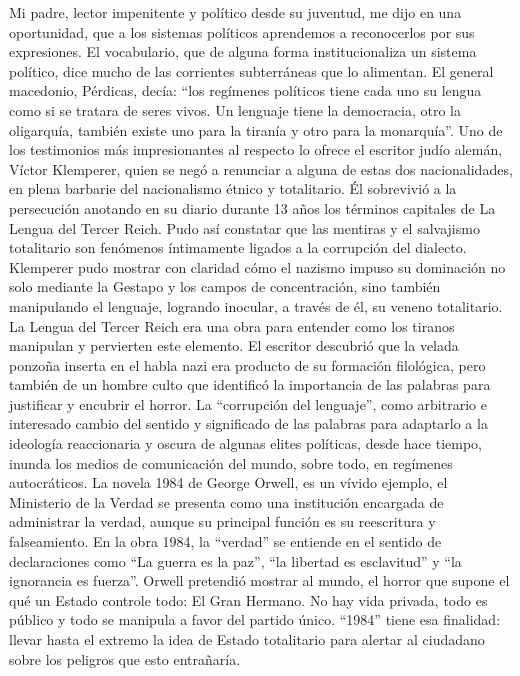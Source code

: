 \documentclass{article}%
\begin{document}
\newline%
%
Mi padre, lector impenitente y político desde su juventud, me dijo en una oportunidad, que a los sistemas políticos aprendemos a reconocerlos por sus expresiones. El vocabulario, que de alguna forma institucionaliza un sistema político,  dice mucho de las corrientes subterráneas que lo alimentan. El general macedonio,  Pérdicas, decía: “los regímenes políticos  tiene cada uno su lengua como si se tratara de seres vivos. Un lenguaje tiene la democracia, otro la oligarquía, también existe uno para la tiranía y otro para la monarquía”.%
\newline%
%
Uno de los testimonios más impresionantes al respecto lo ofrece el escritor judío alemán, Víctor Klemperer, quien se negó a renunciar a alguna de estas dos nacionalidades, en plena barbarie del nacionalismo étnico y totalitario. Él sobrevivió a la persecución anotando en su diario durante 13 años los términos capitales de La Lengua del Tercer Reich.  Pudo así constatar que las mentiras y el salvajismo totalitario son fenómenos íntimamente ligados a la corrupción del dialecto.%
\newline%
%
Klemperer pudo mostrar con claridad cómo el nazismo impuso su dominación no solo mediante la Gestapo y los campos de concentración, sino también manipulando el lenguaje, logrando inocular, a través de él, su veneno totalitario. La Lengua del Tercer Reich era una obra para entender como los tiranos manipulan y pervierten este elemento. El escritor descubrió que la velada ponzoña inserta en el habla nazi era producto de su formación filológica, pero también de un hombre culto que identificó la importancia de las palabras para justificar y encubrir el horror.%
\newline%
%
La “corrupción del lenguaje”, como arbitrario e interesado cambio del sentido y significado de las palabras para adaptarlo a la ideología reaccionaria y oscura de algunas elites políticas, desde hace tiempo, inunda los medios de comunicación del mundo, sobre todo, en regímenes autocráticos.  La novela 1984 de George Orwell, es un vívido ejemplo, el Ministerio de la Verdad  se presenta como una institución encargada de administrar la verdad, aunque su principal función es su reescritura y falseamiento.%
\newline%
%
En la obra 1984, la “verdad” se entiende en el sentido de declaraciones como “La guerra es la paz”, “la libertad es esclavitud” y “la ignorancia es fuerza”. Orwell pretendió mostrar al mundo, el horror que supone el qué un Estado controle todo: El Gran Hermano. No hay vida privada, todo es público y todo se manipula a favor del partido único. “1984” tiene esa finalidad: llevar hasta el extremo la idea de Estado totalitario para alertar al ciudadano sobre los peligros que esto entrañaría.%
\end{document}
